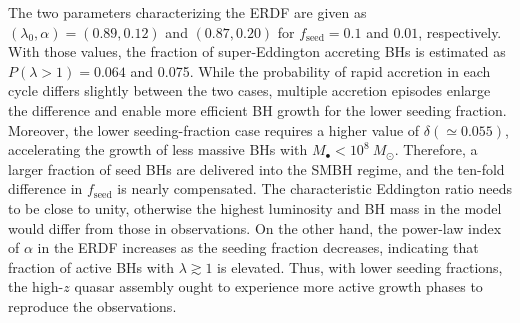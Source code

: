 \documentclass[twocolumn, twocolappendix]{aastex63}
\newcommand{\Msun}{M_\odot}
\newcommand{\fseed}{f_\mathrm{seed}}
\begin{document}
\begin{CJK*}{UTF8}{gbsn}
The two parameters characterizing the ERDF are given as
$(\lambda_0,\alpha) = (0.89,0.12)$ and $(0.87,0.20)$ for $\fseed=0.1$ and $0.01$, respectively.
With those values, the fraction of super-Eddington accreting BHs is estimated as $P(\lambda>1)=0.064$ and 0.075.
While the probability of rapid accretion in each cycle differs slightly between the two cases,
multiple accretion episodes enlarge the difference and enable more efficient BH growth for the lower seeding fraction.
Moreover, the lower seeding-fraction case requires a higher value of $\delta (\simeq 0.055)$, accelerating 
the growth of less massive BHs with $M_\bullet <10^8~\Msun$.
Therefore, a larger fraction of seed BHs are delivered into the SMBH regime,
and the ten-fold difference in $\fseed$ is nearly compensated.
The characteristic Eddington ratio needs to be close to unity, otherwise the highest luminosity and BH mass
in the model would differ from those in observations.
On the other hand, the power-law index of $\alpha$ in the ERDF increases as the seeding fraction decreases,
indicating that fraction of active BHs with $\lambda \gtrsim 1$ is elevated. 
Thus, with lower seeding fractions, the high-$z$ quasar assembly ought to experience more active growth phases to reproduce the observations.


\end{CJK*}
\end{document}
